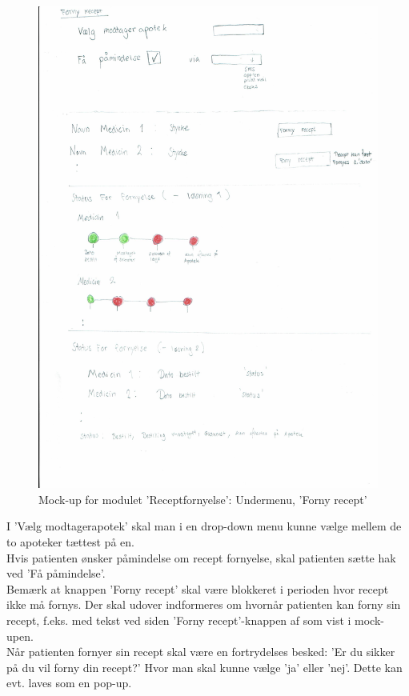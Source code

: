 \begin{figure}[H]
	\centering
	\includegraphics[angle=0, height=0.85\textheight]{Materials/FornyRecept.pdf}
	\caption{Mock-up for modulet 'Receptfornyelse': Undermenu, 'Forny recept'}
	\label{fig:Mock-Up}
\end{figure}
I 'Vælg modtagerapotek' skal man i en drop-down menu kunne vælge mellem de to apoteker tættest på en.\\
Hvis patienten ønsker påmindelse om recept fornyelse, skal patienten sætte hak ved 'Få påmindelse'.\\
Bemærk at knappen 'Forny recept' skal være blokkeret i perioden hvor recept ikke må fornys. Der skal udover indformeres om hvornår patienten kan forny sin recept, f.eks. med tekst ved siden 'Forny recept'-knappen af som vist i mock-upen.\\
Når patienten fornyer sin recept skal være en fortrydelses besked: 'Er du sikker på du vil forny din recept?' Hvor man skal kunne vælge 'ja' eller 'nej'. Dette kan evt. laves som en pop-up. \\
